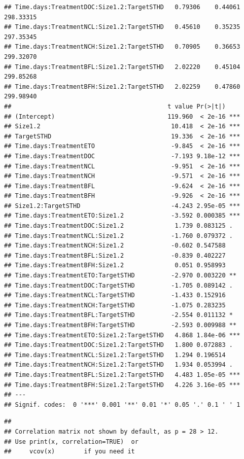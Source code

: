 \documentclass[
]{article}
\begin{document}
\begin{verbatim}
## Time.days:TreatmentDOC:Size1.2:TargetSTHD   0.79306    0.44061 298.33315
## Time.days:TreatmentNCL:Size1.2:TargetSTHD   0.45610    0.35235 297.35345
## Time.days:TreatmentNCH:Size1.2:TargetSTHD   0.70905    0.36653 299.32070
## Time.days:TreatmentBFL:Size1.2:TargetSTHD   2.02220    0.45104 299.85268
## Time.days:TreatmentBFH:Size1.2:TargetSTHD   2.02259    0.47860 299.98940
##                                           t value Pr(>|t|)    
## (Intercept)                               119.960  < 2e-16 ***
## Size1.2                                    10.418  < 2e-16 ***
## TargetSTHD                                 19.336  < 2e-16 ***
## Time.days:TreatmentETO                     -9.845  < 2e-16 ***
## Time.days:TreatmentDOC                     -7.193 9.18e-12 ***
## Time.days:TreatmentNCL                     -9.951  < 2e-16 ***
## Time.days:TreatmentNCH                     -9.571  < 2e-16 ***
## Time.days:TreatmentBFL                     -9.624  < 2e-16 ***
## Time.days:TreatmentBFH                     -9.926  < 2e-16 ***
## Size1.2:TargetSTHD                         -4.243 2.95e-05 ***
## Time.days:TreatmentETO:Size1.2             -3.592 0.000385 ***
## Time.days:TreatmentDOC:Size1.2              1.739 0.083125 .  
## Time.days:TreatmentNCL:Size1.2             -1.760 0.079372 .  
## Time.days:TreatmentNCH:Size1.2             -0.602 0.547588    
## Time.days:TreatmentBFL:Size1.2             -0.839 0.402227    
## Time.days:TreatmentBFH:Size1.2              0.051 0.958993    
## Time.days:TreatmentETO:TargetSTHD          -2.970 0.003220 ** 
## Time.days:TreatmentDOC:TargetSTHD          -1.705 0.089142 .  
## Time.days:TreatmentNCL:TargetSTHD          -1.433 0.152916    
## Time.days:TreatmentNCH:TargetSTHD          -1.075 0.283235    
## Time.days:TreatmentBFL:TargetSTHD          -2.554 0.011132 *  
## Time.days:TreatmentBFH:TargetSTHD          -2.593 0.009988 ** 
## Time.days:TreatmentETO:Size1.2:TargetSTHD   4.868 1.84e-06 ***
## Time.days:TreatmentDOC:Size1.2:TargetSTHD   1.800 0.072883 .  
## Time.days:TreatmentNCL:Size1.2:TargetSTHD   1.294 0.196514    
## Time.days:TreatmentNCH:Size1.2:TargetSTHD   1.934 0.053994 .  
## Time.days:TreatmentBFL:Size1.2:TargetSTHD   4.483 1.05e-05 ***
## Time.days:TreatmentBFH:Size1.2:TargetSTHD   4.226 3.16e-05 ***
## ---
## Signif. codes:  0 '***' 0.001 '**' 0.01 '*' 0.05 '.' 0.1 ' ' 1
\end{verbatim}

\begin{verbatim}
## 
## Correlation matrix not shown by default, as p = 28 > 12.
## Use print(x, correlation=TRUE)  or
##     vcov(x)        if you need it
\end{verbatim}
\end{document}
